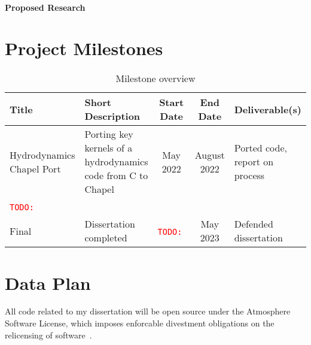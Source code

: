 \documentclass{article}
\newcommand{\todo}[1]{{\textcolor{red}{{\tt{TODO:}}\,\,#1 }}}
\begin{document}
\paragraph{Proposed Research}






\section{Project Milestones}

\begin{table*}[h]
    \centering
\begin{tabular}{|p{2.5cm}|p{5cm}|c|c|p{3cm}|}
    \hline
    \textbf{Title} & Short Description & Start Date & End Date & Deliverable(s)\\
    \hline
    Hydrodynamics \linebreak Chapel Port & Porting key kernels of a hydrodynamics code from C to Chapel & May 2022 & August 2022 & Ported code, report on process \\
    \hline
    \todo{} & & & & \\
    \hline
    Final & Dissertation completed & \todo{} & May 2023 & Defended dissertation\\
    \hline
\end{tabular}

\caption{Milestone overview}
\label{MilestoneTable}
\end{table*}


\section{Data Plan}

All code related to my dissertation will be open source under the Atmosphere Software License, which imposes enforcable divestment obligations on the relicensing of software~\cite{atmospherelicense}. 


\end{document}
